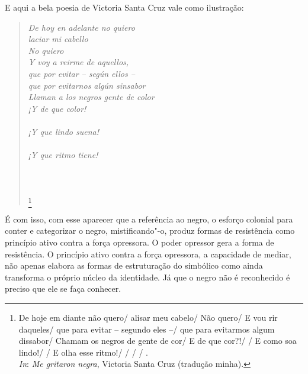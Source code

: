 E aqui a bela poesia de Victoria Santa Cruz vale como ilustração:

\begin{verse}
\emph{De hoy en adelante no quiero\\
laciar mi cabello\\
No quiero\\
Y voy a reirme de aquellos,\\
que por evitar -- según ellos --\\
que por evitarnos algún sinsabor\\
Llaman a los negros gente de color\\
¡Y de que color!\\
\\
¡Y que lindo suena!\\
\\
¡Y que ritmo tiene!\\
   \\
   \\
   \\
  }\footnote{De hoje em diante não quero/
  alisar meu cabelo/
  Não quero/
  E vou rir daqueles/
  que para evitar -- segundo eles --/
  que para evitarmos algum dissabor/
  Chamam os negros de gente de cor/
  E de que cor?!/
  /
  E como soa lindo!/
  /
  E olha esse ritmo!/
     /
     /
     /
    .\\
  \emph{In}: \emph{Me gritaron negra}, Victoria Santa Cruz (tradução minha).}
  \end{verse}

É com isso, com esse aparecer que
a referência ao negro, o esforço colonial para conter e categorizar o
negro, mistificando"-o, produz formas de resistência como princípio ativo
contra a força opressora. O poder opressor gera a forma de resistência.
O princípio ativo contra a força opressora, a capacidade de mediar, não
apenas elabora as formas de estruturação do simbólico como ainda
transforma o próprio núcleo da identidade. Já que o negro não é
reconhecido é preciso que ele se faça conhecer.


